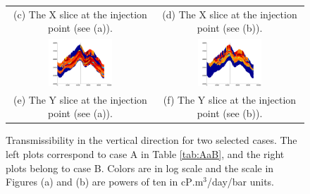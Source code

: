 \begin{figure}
\begin{tabular}{cc}
\\(c) The X slice at the injection point (see (a)).&
(d) The X slice at the injection point (see (b)).\\
\includegraphics[width=0.45\textwidth]{./figurer/C02222_LogKz_slcy}&
\includegraphics[width=0.45\textwidth]{./figurer/C03211_LogKz_slcy}
\\(e) The Y slice at the injection point (see (a)).&
(f) The Y slice at the injection point (see (b)).
\end{tabular}
\caption{Transmissibility in the vertical direction for two selected cases. The left plots correspond to case A in Table \ref{tab:AaB}, and the right plots belong to case B. Colors are in log scale and the scale in Figures (a) and (b) are powers of ten in cP$.$m$^3$/day/bar units.}
\label{fig:Kz}
\end{figure}

